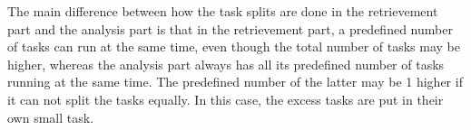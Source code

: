 The main difference between how the task splits are done in the retrievement
part and the analysis part is that in the retrievement part, a predefined number
of tasks can run at the same time, even though the total number of tasks may be
higher, whereas the analysis part always has all its predefined number of tasks
running at the same time. The predefined number of the latter may be 1 higher if
it can not split the tasks equally. In this case, the excess tasks are
put in their own small task. 


